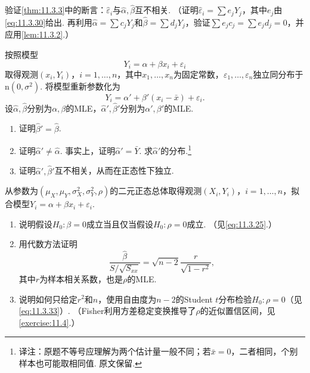 \begin{exercise}\label{exercise:11.31}
验证\autoref{thm:11.3.3}中的断言：$\hat\varepsilon_i$与$\hat\alpha,\hat\beta$互不相关. （证明$\hat\varepsilon_i=\sum e_jY_j$，其中$e_j$由\eqref{eq:11.3.30}给出. 再利用$\hat\alpha=\sum c_jY_j$和$\hat\beta=\sum d_jY_j$，验证$\sum e_jc_j=\sum e_jd_j=0$，并应用\autoref{lem:11.3.2}.）
\end{exercise}

\begin{exercise}\label{exercise:11.32}
按照模型
$$Y_i=\alpha+\beta x_i+\varepsilon_i$$
取得观测$(x_i,Y_i)$，$i=1,\ldots,n$，其中$x_1,\ldots,x_n$为固定常数，$\varepsilon_1,\ldots,\varepsilon_n$独立同分布于$\mathrm n(0,\sigma^2)$. 将模型重新参数化为
$$Y_i=\alpha'+\beta'(x_i-\bar x)+\varepsilon_i.$$
设$\hat\alpha,\hat\beta$分别为$\alpha,\beta$的MLE，$\hat\alpha',\hat\beta'$分别为$\alpha',\beta'$的MLE.
\begin{enumerate}[label=(\alph*)]
\item\label{item:11.32.a} 证明$\hat\beta'=\hat\beta$.
\item\label{item:11.32.b} 证明$\hat\alpha'\ne\hat\alpha$. 事实上，证明$\hat\alpha'=\bar Y$. 求$\hat\alpha'$的分布.\footnote{译注：原题不等号应理解为两个估计量一般不同；若$\bar x=0$，二者相同，个别样本也可能取相同值. 原文保留.}
\item\label{item:11.32.c} 证明$\hat\alpha',\hat\beta'$互不相关，从而在正态性下独立.
\end{enumerate}
\end{exercise}

\begin{exercise}\label{exercise:11.33}
从参数为$(\mu_X,\mu_Y,\sigma_X^2,\sigma_Y^2,\rho)$的二元正态总体取得观测$(X_i,Y_i)$，$i=1,\ldots,n$，拟合模型$Y_i=\alpha+\beta x_i+\varepsilon_i$.
\begin{enumerate}[label=(\alph*)]
\item\label{item:11.33.a} 说明假设$H_0:\beta=0$成立当且仅当假设$H_0:\rho=0$成立. （见\eqref{eq:11.3.25}.）
\item\label{item:11.33.b} 用代数方法证明
$$\frac{\hat\beta}{S/\sqrt{S_{xx}}}=\sqrt{n-2}\frac r{\sqrt{1-r^2}},$$
其中$r$为样本相关系数，也是$\rho$的MLE.
\item\label{item:11.33.c} 说明如何只给定$r^2$和$n$，使用自由度为$n-2$的Student $t$分布检验$H_0:\rho=0$（见\eqref{eq:11.3.33}）. （Fisher利用方差稳定变换推导了$\rho$的近似置信区间，见\autoref{exercise:11.4}.）
\end{enumerate}
\end{exercise}

